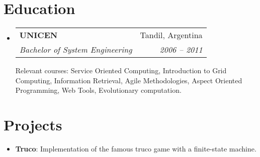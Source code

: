 \documentclass[letterpaper,11pt]{article}
\makeatletter
\newcommand{\resumeItem}[2]{
  \item\small{
    \textbf{#1}{: #2 \vspace{-2pt}}
  }
}
\newcommand{\resumeSubheadingDescription}[5]{
  \vspace{-1pt}\item
    \begin{tabular*}{0.97\textwidth}[t]{l@{\extracolsep{\fill}}r}
      \textbf{#1} & #2 \\
      \textit{\small#3} & \textit{\small #4} \\
    \end{tabular*}\vspace{1pt}
	\small#5\vspace{-4pt}
}
\newcommand{\resumeSubItem}[2]{\resumeItem{#1}{#2}\vspace{-4pt}}
\newcommand{\resumeSubHeadingListStart}{\begin{itemize}[leftmargin=*]}
\newcommand{\resumeSubHeadingListEnd}{\end{itemize}}
\makeatother
\begin{document}
\section{Education}
  \resumeSubHeadingListStart
    \resumeSubheadingDescription
      {UNICEN}{Tandil, Argentina}
      {Bachelor of System Engineering}{2006 -- 2011}
      {Relevant courses: Service Oriented Computing, Introduction to Grid Computing, Information Retrieval, Agile Methodologies, Aspect Oriented Programming, Web Tools, Evolutionary computation.}
  \resumeSubHeadingListEnd

\section{Projects}
  \resumeSubHeadingListStart
    \resumeSubItem{Truco}
      {Implementation of the famous truco game with a finite-state machine.}
  \resumeSubHeadingListEnd
\end{document}
